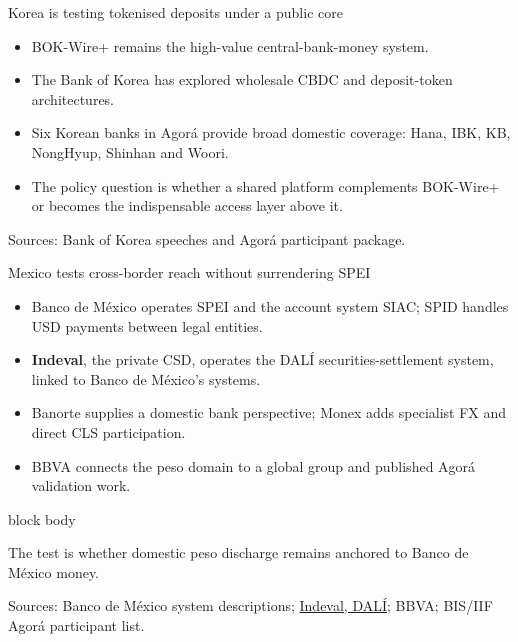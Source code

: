 \documentclass[aspectratio=169,12pt]{beamer}
\newcommand{\rust}[1]{\textcolor{Rust}{\textbf{#1}}}
\newcommand{\source}[1]{\vfill\par\fontsize{5.4}{6.5}\selectfont\color{Quiet}Sources: #1}
\newcommand{\tightitems}{\setlength{\itemsep}{0.42em}\setlength{\parskip}{0pt}}
\newenvironment{statement}{%
  \begin{beamercolorbox}[sep=.18cm,rounded=false,wd=\linewidth]{block body}%
  \fontsize{13}{15.5}\selectfont\bfseries
}{\end{beamercolorbox}}
\begin{document}
\begin{frame}{Korea is testing tokenised deposits under a public core} %
  \begin{itemize}\tightitems
    \item BOK-Wire+ remains the high-value central-bank-money system.
    \item The Bank of Korea has explored wholesale CBDC and deposit-token architectures.
    \item Six Korean banks in Agor\'a provide broad domestic coverage: Hana, IBK, KB, NongHyup, Shinhan and Woori.
    \item The policy question is whether a shared platform complements BOK-Wire+ or becomes the indispensable access layer above it.
  \end{itemize}
  \source{Bank of Korea speeches and Agor\'a participant package.}
\end{frame}

\begin{frame}{Mexico tests cross-border reach without surrendering SPEI}
  \begin{itemize}\tightitems
    \item Banco de M\'exico operates SPEI and the account system SIAC; SPID handles USD payments between legal entities.
    \item \rust{Indeval}, the private CSD, operates the DAL\'I securities-settlement system, linked to Banco de M\'exico's systems.
    \item Banorte supplies a domestic bank perspective; Monex adds specialist FX and direct CLS participation.
    \item BBVA connects the peso domain to a global group and published Agor\'a validation work.
  \end{itemize}
  \begin{statement}
    The test is whether domestic peso discharge remains anchored to Banco de M\'exico money.
  \end{statement}
  \source{Banco de M\'exico system descriptions; \href{https://www.indeval.com.mx/en/product?p=clearing-settlement}{Indeval, DAL\'I}; BBVA; BIS/IIF Agor\'a participant list.}
\end{frame}
\end{document}
